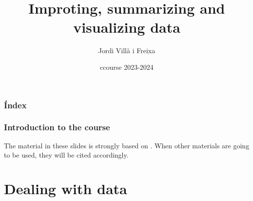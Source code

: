 \documentclass{beamer}
\title[Introduction]{Improting, summarizing and visualizing data} %
\author{Jordi Villà i Freixa} %
\institute[FCTE] %
{
Universitat de Vic - Universitat Central de Catalunya \\
Study Abroad\\ %
\medskip
\textit{jordi.villa@uvic.cat} %
}
\date{ccourse 2023-2024}
\begin{document}
\begin{frame}
\titlepage %
\end{frame}

\begin{frame}
\frametitle{Índex} %
\tableofcontents %
\end{frame}


\begin{frame}
  \frametitle{Introduction to the course}
  The material in these slides is strongly based on \cite{kroese2020}. When other materials are going to be used, they will be cited accordingly.
  \end{frame}

\section{Dealing with data} %

\end{document}

